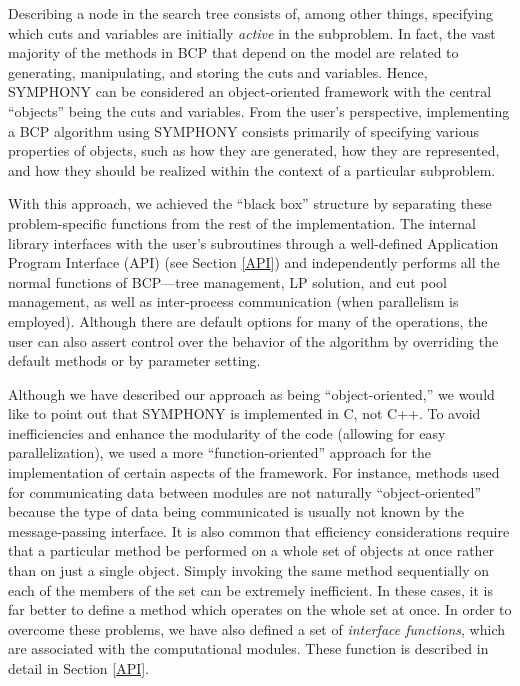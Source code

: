 Describing a node in the search tree consists of, among other things,
specifying which cuts and variables are initially {\em active} in the
subproblem. In fact, the vast majority of the methods in BCP that
depend on the model are related to generating, manipulating, and
storing the cuts and variables. Hence, SYMPHONY can be considered an
object-oriented framework with the central ``objects'' being the cuts
and variables. From the user's perspective, implementing a BCP
algorithm using SYMPHONY consists primarily of specifying various
properties of objects, such as how they are generated, how they are
represented, and how they should be realized within the context of a
particular subproblem.

With this approach, we achieved the ``black box'' structure by
separating these problem-specific functions from the rest of the
implementation. The internal library interfaces with the user's
subroutines through a well-defined Application Program Interface (API) (see
Section \ref{API})
and independently performs all the normal functions of BCP---tree
management, LP solution, and cut pool management, as well as inter-process
communication (when parallelism is employed). Although there are
default options for many of the operations, the user can also assert
control over the behavior of the algorithm by overriding the default
methods or by parameter setting.

Although we have described our approach as being ``object-oriented,''
we would like to point out that SYMPHONY is implemented in C, not C++.
To avoid inefficiencies and enhance the modularity of the code
(allowing for easy parallelization), we used a more
``function-oriented'' approach for the implementation of certain
aspects of the framework. For instance, methods used for communicating
data between modules are not naturally ``object-oriented'' because the
type of data being communicated is usually not known by the
message-passing interface. It is also common that efficiency
considerations require that a particular method be performed on a
whole set of objects at once rather than on just a single object.
Simply invoking the same method sequentially on each of the members of
the set can be extremely inefficient. In these cases, it is far better
to define a method which operates on the whole set at once. In order
to overcome these problems, we have also defined a set of {\em
interface functions}, which are associated with the computational
modules. These function is described in detail in Section \ref{API}.

